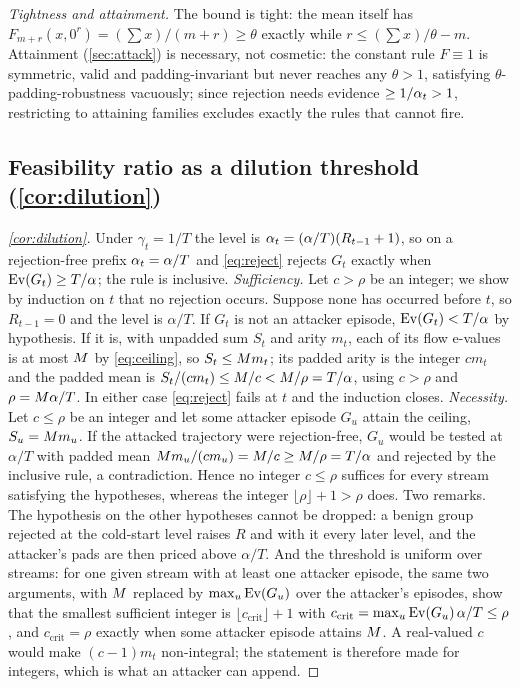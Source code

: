 \emph{Tightness and attainment.} The bound is tight: the mean itself has $F_{m+r}(x,0^r)=(\sum
x)/(m+r)\ge\theta$ exactly while $r\le(\sum x)/\theta-m$. Attainment (\cref{sec:attack}) is necessary,
not cosmetic: the constant rule $F\equiv1$ is symmetric, valid and padding-invariant but never
reaches any $\theta>1$, satisfying $\theta$-padding-robustness vacuously; since rejection needs
evidence $\ge1/\alpha_t>1$, restricting to attaining families excludes exactly the rules that
cannot fire.

\subsection{Feasibility ratio as a dilution threshold (\cref{cor:dilution})}

\begin{proof}[\cref{cor:dilution}]
Under $\gamma_t=1/T$ the level is $\alpha_t=(\alpha/T)(R_{t-1}+1)$, so on a rejection-free prefix
$\alpha_t=\alpha/T$ and \eqref{eq:reject} rejects $G_t$ exactly when $\mathrm{Ev}(G_t)\ge T/\alpha$; the rule
is inclusive. \emph{Sufficiency.} Let $c>\rho$ be an integer; we show by induction on $t$ that no
rejection occurs. Suppose none has occurred before $t$, so $R_{t-1}=0$ and the level is $\alpha/T$.
If $G_t$ is not an attacker episode, $\mathrm{Ev}(G_t)<T/\alpha$ by hypothesis. If it is, with unpadded sum
$S_t$ and arity $m_t$, each of its flow e-values is at most $M$ by \eqref{eq:ceiling}, so
$S_t\le M m_t$; its padded arity is the integer $cm_t$ and the padded mean is
$S_t/(cm_t)\le M/c<M/\rho=T/\alpha$, using $c>\rho$ and $\rho=M\alpha/T$. In either case
\eqref{eq:reject} fails at $t$ and the induction closes. \emph{Necessity.} Let $c\le\rho$ be an
integer and let some attacker episode $G_u$ attain the ceiling, $S_u=M m_u$. If the attacked
trajectory were rejection-free, $G_u$ would be tested at $\alpha/T$ with padded mean
$M m_u/(cm_u)=M/c\ge M/\rho=T/\alpha$ and rejected by the inclusive rule, a
contradiction. Hence no integer $c\le\rho$ suffices for every stream satisfying the hypotheses,
whereas the integer $\lfloor\rho\rfloor+1>\rho$ does. Two remarks. The hypothesis on the other
hypotheses cannot be dropped: a benign group rejected at the cold-start level raises $R$ and with it
every later level, and the attacker's pads are then priced above $\alpha/T$. And the threshold is
uniform over streams: for one given stream with at least one attacker episode, the same two
arguments, with $M$ replaced by $\max_u\mathrm{Ev}(G_u)$ over the attacker's episodes, show that the
smallest sufficient integer is
$\lfloor c_{\mathrm{crit}}\rfloor+1$ with $c_{\mathrm{crit}}=\max_u\mathrm{Ev}(G_u)\,\alpha/T\le\rho$, and
$c_{\mathrm{crit}}=\rho$ exactly when some attacker episode attains $M$. A real-valued $c$ would
make $(c-1)m_t$ non-integral; the statement is therefore made for integers, which is what an attacker
can append.
\end{proof}

